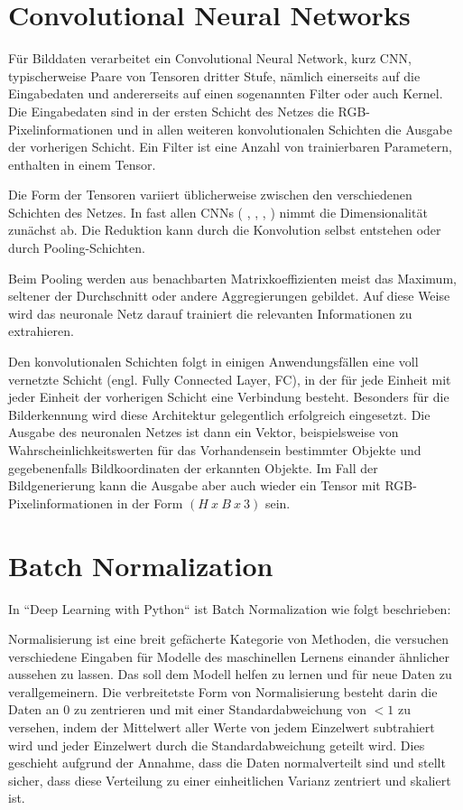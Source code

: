 \section{Convolutional Neural Networks}
\label{sec:cnn}
Für Bilddaten verarbeitet ein Convolutional Neural Network, kurz CNN, typischerweise Paare von Tensoren dritter Stufe, nämlich einerseits auf die Eingabedaten und andererseits auf einen sogenannten Filter oder auch Kernel. Die Eingabedaten sind in der ersten Schicht des Netzes die RGB-Pixelinformationen und in allen weiteren konvolutionalen Schichten die Ausgabe der vorherigen Schicht. Ein Filter ist eine Anzahl von trainierbaren Parametern, enthalten in einem Tensor.

Die Form der Tensoren variiert üblicherweise zwischen den verschiedenen Schichten des Netzes. In fast allen CNNs ( \cite{isola2018imagetoimage}, \cite{goodfellow2016deeplearning}, \cite{Lecun99objectrecognition}, \cite{RFB15a}) nimmt die Dimensionalität zunächst ab. Die Reduktion kann durch die Konvolution selbst entstehen oder durch Pooling-Schichten.

Beim Pooling werden aus benachbarten Matrixkoeffizienten meist das Maximum, seltener der Durchschnitt oder andere Aggregierungen gebildet. Auf diese Weise wird das neuronale Netz darauf trainiert die relevanten Informationen zu extrahieren. \cite{goodfellow2016deeplearning}

Den konvolutionalen Schichten folgt in einigen Anwendungsfällen eine voll vernetzte Schicht (engl. Fully Connected Layer, FC), in der für jede Einheit mit jeder Einheit der vorherigen Schicht eine Verbindung besteht. Besonders für die Bilderkennung wird diese Architektur gelegentlich erfolgreich eingesetzt. Die Ausgabe des neuronalen Netzes ist dann ein Vektor, beispielsweise von Wahrscheinlichkeitswerten für das Vorhandensein bestimmter Objekte und gegebenenfalls Bildkoordinaten der erkannten Objekte. Im Fall der Bildgenerierung kann die Ausgabe aber auch wieder ein Tensor mit RGB-Pixelinformationen in der Form $(H\ x\ B\ x\ 3)$ sein.

\section{Batch Normalization}
In ``Deep Learning with Python`` \cite{chollet2021deep} ist Batch Normalization wie folgt beschrieben:

Normalisierung ist eine breit gefächerte Kategorie von Methoden, die versuchen verschiedene Eingaben für Modelle des maschinellen Lernens einander ähnlicher aussehen zu lassen. Das soll dem Modell helfen zu lernen und für neue Daten zu verallgemeinern. Die verbreitetste Form von Normalisierung besteht darin die Daten an $0$ zu zentrieren und mit einer Standardabweichung von $<1$ zu versehen, indem der Mittelwert aller Werte von jedem Einzelwert subtrahiert wird und jeder Einzelwert durch die Standardabweichung geteilt wird. Dies geschieht aufgrund der Annahme, dass die Daten normalverteilt sind und stellt sicher, dass diese Verteilung zu einer einheitlichen Varianz zentriert und skaliert ist.

